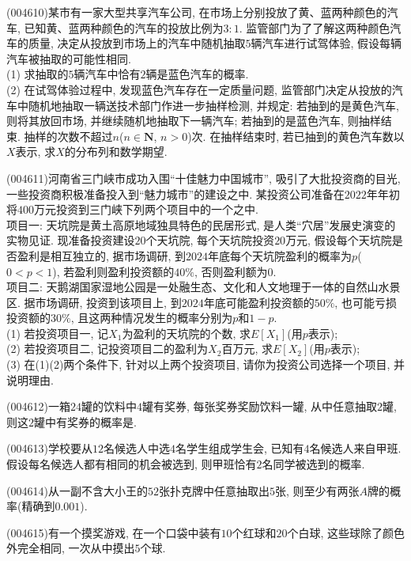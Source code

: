 \item (004610)某市有一家大型共享汽车公司, 在市场上分别投放了黄、蓝两种颜色的汽车, 已知黄、蓝两种颜色的汽车的投放比例为$3:1$. 监管部门为了了解这两种颜色汽车的质量, 决定从投放到市场上的汽车中随机抽取$5$辆汽车进行试驾体验, 假设每辆汽车被抽取的可能性相同.\\
(1) 求抽取的$5$辆汽车中恰有$2$辆是蓝色汽车的概率.\\
(2) 在试驾体验过程中, 发现蓝色汽车存在一定质量问题, 监管部门决定从投放的汽车中随机地抽取一辆送技术部门作进一步抽样检测, 并规定: 若抽到的是黄色汽车, 则将其放回市场, 并继续随机地抽取下一辆汽车; 若抽到的是蓝色汽车, 则抽样结束. 抽样的次数不超过$n$($n\in \mathbf{N}$, $n>0$)次. 在抽样结束时, 若已抽到的黄色汽车数以$X$表示, 求$X$的分布列和数学期望.
\item (004611)河南省三门峡市成功入围``十佳魅力中国城市'', 吸引了大批投资商的目光, 一些投资商积极准备投入到``魅力城市''的建设之中. 某投资公司准备在$2022$年年初将$400$万元投资到三门峡下列两个项目中的一个之中.\\
项目一: 天坑院是黄土高原地域独具特色的民居形式, 是人类``穴居''发展史演变的实物见证. 现准备投资建设$20$个天坑院, 每个天坑院投资$20$万元, 假设每个天坑院是否盈利是相互独立的, 据市场调研, 到$2024$年底每个天坑院盈利的概率为$p$($0<p<1$), 若盈利则盈利投资额的$40\%$, 否则盈利额为$0$.\\
项目二: 天鹅湖国家湿地公园是一处融生态、文化和人文地理于一体的自然山水景区. 据市场调研, 投资到该项目上, 到$2024$年底可能盈利投资额的$50\%$, 也可能亏损投资额的$30\%$, 且这两种情况发生的概率分别为$p$和$1-p$.\\
(1) 若投资项目一, 记$X_1$为盈利的天坑院的个数, 求$E[X_1]$(用$p$表示);\\
(2) 若投资项目二, 记投资项目二的盈利为$X_2$百万元, 求$E[X_2]$(用$p$表示);\\
(3) 在(1)(2)两个条件下, 针对以上两个投资项目, 请你为投资公司选择一个项目, 并说明理由.
\item (004612)一箱$24$罐的饮料中$4$罐有奖券, 每张奖券奖励饮料一罐, 从中任意抽取$2$罐, 则这$2$罐中有奖券的概率是.
\item (004613)学校要从$12$名候选人中选$4$名学生组成学生会, 已知有$4$名候选人来自甲班. 假设每名候选人都有相同的机会被选到, 则甲班恰有$2$名同学被选到的概率.
\item (004614)从一副不含大小王的$52$张扑克牌中任意抽取出$5$张, 则至少有两张$A$牌的概率(精确到$0.001$).
\item (004615)有一个摸奖游戏, 在一个口袋中装有$10$个红球和$20$个白球, 这些球除了颜色外完全相同, 一次从中摸出$5$个球.\\
